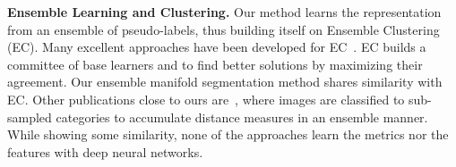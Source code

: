 \documentclass{bmvc2k}
\begin{document}

\noindent
\textbf{Ensemble Learning and Clustering.} 
Our method learns the representation from an ensemble of pseudo-labels, 
thus building itself on Ensemble Clustering (EC). Many excellent approaches have been developed for EC~\cite{strehl2002cluster, dai:ensemble:eccv12, spectral:ensemble:clustering}. EC builds a committee of base
learners and to find better solutions by maximizing their agreement. Our ensemble manifold segmentation method shares similarity with EC. Other publications close to ours
are~\cite{strehl2002cluster,ensemble:iccv11,dai:ensemble:eccv12},
where images are classified to sub-sampled categories to accumulate
distance measures in an ensemble manner. While showing some similarity,
none of the approaches learn the metrics nor the features with deep neural
networks.

\end{document}
